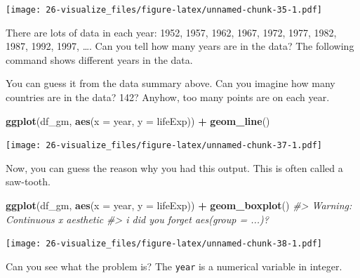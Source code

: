 \documentclass[
  xelatex, ja=standard]{bxjsbook}
\newenvironment{Shaded}{\begin{snugshade}}{\end{snugshade}}
\newcommand{\AttributeTok}[1]{\textcolor[rgb]{0.13,0.29,0.53}{#1}}
\newcommand{\CommentTok}[1]{\textcolor[rgb]{0.56,0.35,0.01}{\textit{#1}}}
\newcommand{\FunctionTok}[1]{\textcolor[rgb]{0.13,0.29,0.53}{\textbf{#1}}}
\newcommand{\NormalTok}[1]{#1}
\newcommand{\SpecialCharTok}[1]{\textcolor[rgb]{0.81,0.36,0.00}{\textbf{#1}}}
\theoremstyle{definition}
\theoremstyle{definition}
\theoremstyle{definition}
\theoremstyle{definition}
\theoremstyle{remark}
\begin{document}
\texttt{[image: 26-visualize\_files/figure-latex/unnamed-chunk-35-1.pdf]}

There are lots of data in each year: 1952, 1957, 1962, 1967, 1972, 1977, 1982, 1987, 1992, 1997, \ldots. Can you tell how many years are in the data? The following command shows different years in the data.

\begin{Shaded}
\end{Shaded}

You can guess it from the data summary above. Can you imagine how many countries are in the data? 142? Anyhow, too many points are on each year.

\begin{Shaded}
\begin{Highlighting}[]
\FunctionTok{ggplot}\NormalTok{(df\_gm, }\FunctionTok{aes}\NormalTok{(}\AttributeTok{x =}\NormalTok{ year, }\AttributeTok{y =}\NormalTok{ lifeExp)) }\SpecialCharTok{+} \FunctionTok{geom\_line}\NormalTok{()}
\end{Highlighting}
\end{Shaded}

\texttt{[image: 26-visualize\_files/figure-latex/unnamed-chunk-37-1.pdf]}

Now, you can guess the reason why you had this output. This is often called a saw-tooth.

\begin{Shaded}
\begin{Highlighting}[]
\FunctionTok{ggplot}\NormalTok{(df\_gm, }\FunctionTok{aes}\NormalTok{(}\AttributeTok{x =}\NormalTok{ year, }\AttributeTok{y =}\NormalTok{ lifeExp)) }\SpecialCharTok{+} \FunctionTok{geom\_boxplot}\NormalTok{()}
\CommentTok{\#\textgreater{} Warning: Continuous x aesthetic}
\CommentTok{\#\textgreater{} i did you forget \textasciigrave{}aes(group = ...)\textasciigrave{}?}
\end{Highlighting}
\end{Shaded}

\texttt{[image: 26-visualize\_files/figure-latex/unnamed-chunk-38-1.pdf]}

Can you see what the problem is? The \texttt{year} is a numerical variable in integer.
\end{document}
